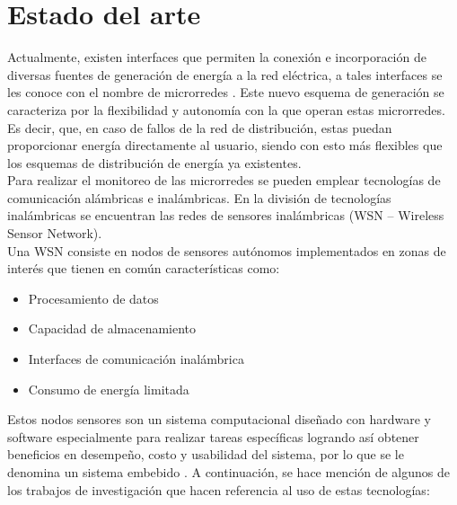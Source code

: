 \section{Estado del arte}
Actualmente, existen interfaces que permiten la conexión e incorporación de diversas fuentes de generación de energía a la red eléctrica, a tales interfaces se les conoce con el nombre de microrredes \citep{Microrredes}. Este nuevo esquema de generación se caracteriza por la flexibilidad y autonomía con la que operan estas microrredes. Es decir, que, en caso de fallos de la red de distribución, estas puedan proporcionar energía directamente al usuario, siendo con esto más flexibles que los esquemas de distribución de energía ya existentes.\\

Para realizar el monitoreo de las microrredes se pueden emplear tecnologías de comunicación alámbricas e inalámbricas. En la división de tecnologías inalámbricas se encuentran las redes de sensores inalámbricas (WSN – Wireless Sensor Network).\\

Una WSN consiste en nodos de sensores autónomos implementados en zonas de interés que tienen en común características como:
\begin{itemize}
	\item Procesamiento de datos
	\item Capacidad de almacenamiento
	\item Interfaces de comunicación inalámbrica
	\item Consumo de energía limitada
\end{itemize}

Estos nodos sensores son un sistema computacional diseñado con hardware y software especialmente para realizar tareas específicas logrando así obtener beneficios en desempeño, costo y usabilidad del sistema, por lo que se le denomina un sistema embebido \citep{SistemaEmbebido}. A continuación, se hace mención de algunos de los trabajos de investigación que hacen referencia al uso de estas tecnologías:\\

